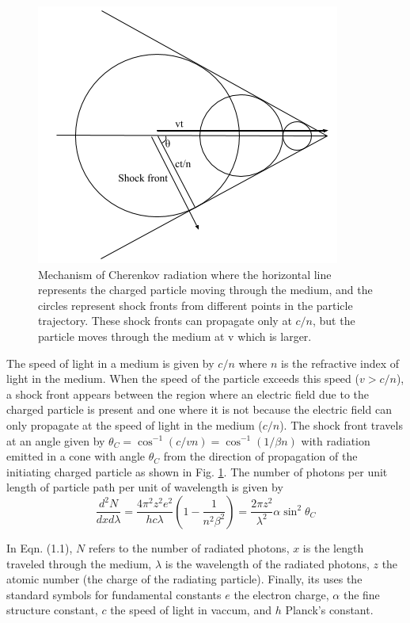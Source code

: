 \documentclass[main.tex]{subfiles}
\begin{document}
\begin{figure}[htbp]
  \centering
  \includegraphics[width=0.6\linewidth]{images/Cherenkov}
  \caption[Mechanism of Cherenkov radiation.]{Mechanism of Cherenkov radiation where the horizontal line represents the charged particle moving through the medium, and the circles represent shock fronts from different points in the particle trajectory. These shock fronts can propagate only at $c/n$, but the particle moves through the medium at v which is larger.}
  \label{fig:Cherenkov}
\end{figure}

The speed of light in a medium is given by $c/n$ where $n$ is the refractive index of light in the medium. When the speed of the particle exceeds this speed ($v>c/n$), a shock front appears between the region where an electric field due to the charged particle is present and one where it is not because the electric field can only propagate at the speed of light in the medium ($c/n$). The shock front travels at an angle given by $\theta_C = \cos^{-1}(c/vn) = \cos^{-1}(1/\beta n)$ with radiation emitted in a cone with angle $\theta_C$ from the direction of propagation of the initiating charged particle as shown in Fig. \ref{fig:Cherenkov}. The number of photons per unit length of particle path per unit of wavelength is given by 
\begin{equation}
  \frac{d^2N}{dxd\lambda} = \frac{4\pi^2z^2e^2}{hc\lambda}\left(1-\frac{1}{n^2\beta^2}\right) = \frac{2\pi z^2}{\lambda^2}\alpha\sin^2\theta_C
\end{equation}

In Eqn. (1.1), $N$ refers to the number of radiated photons, $x$ is the length traveled through the medium, $\lambda$ is the wavelength of the radiated photons, $z$ the atomic number (the charge of the radiating particle). Finally, its uses the standard symbols for fundamental constants $e$ the electron charge, $\alpha$ the fine structure constant, $c$ the speed of light in vaccum, and $h$ Planck's constant.
\end{document}
